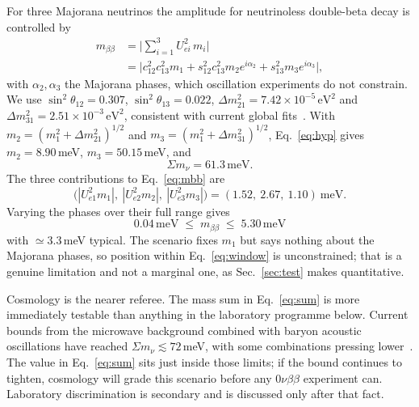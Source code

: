 \documentclass[aps,prd,twocolumn,superscriptaddress,nofootinbib,10pt]{revtex4-2}
\begin{document}
For three Majorana neutrinos the amplitude for neutrinoless double-beta decay is controlled by
%
\begin{equation}
  \begin{aligned}
    m_{\beta\beta} &= \Big| \sum_{i=1}^{3} U_{ei}^2\, m_i \Big| \\[2pt]
    &= \Big| c_{12}^2 c_{13}^2 m_1 + s_{12}^2 c_{13}^2 m_2 e^{i\alpha_2}
       + s_{13}^2 m_3 e^{i\alpha_3} \Big|,
  \end{aligned}
  \label{eq:mbb}
\end{equation}
%
with $\alpha_2, \alpha_3$ the Majorana phases, which oscillation experiments do not constrain. We
use $\sin^2\theta_{12} = 0.307$, $\sin^2\theta_{13} = 0.022$,
$\Delta m^2_{21} = 7.42 \times 10^{-5}\,\mathrm{eV}^2$ and
$\Delta m^2_{31} = 2.51 \times 10^{-3}\,\mathrm{eV}^2$, consistent with current global
fits~\cite{NuFIT2020,PDG2024}. With $m_2 = (m_1^2 + \Delta m^2_{21})^{1/2}$ and
$m_3 = (m_1^2 + \Delta m^2_{31})^{1/2}$, Eq.~\eqref{eq:hyp} gives
$m_2 = 8.90\,$meV, $m_3 = 50.15\,$meV, and
%
\begin{equation}
  \Sigma m_\nu = 61.3\,\mathrm{meV}.
  \label{eq:sum}
\end{equation}
%
The three contributions to Eq.~\eqref{eq:mbb} are
%
\begin{equation}
  \big( |U_{e1}^2 m_1|,\ |U_{e2}^2 m_2|,\ |U_{e3}^2 m_3| \big)
  = (1.52,\ 2.67,\ 1.10)\ \mathrm{meV}.
  \label{eq:terms}
\end{equation}
%
Varying the phases over their full range gives
%
\begin{equation}
  \boxed{\ 0.04\,\mathrm{meV} \;\le\; m_{\beta\beta} \;\le\; 5.30\,\mathrm{meV}\ }
  \label{eq:window}
\end{equation}
%
with $\simeq 3.3\,$meV typical. The scenario fixes $m_1$ but says nothing about the Majorana
phases, so position within Eq.~\eqref{eq:window} is unconstrained; that is a genuine limitation and
not a marginal one, as Sec.~\ref{sec:test} makes quantitative.

Cosmology is the nearer referee. The mass sum in Eq.~\eqref{eq:sum} is more immediately testable
than anything in the laboratory programme below. Current bounds from the microwave background
combined with baryon acoustic oscillations have reached $\Sigma m_\nu \lesssim 72\,$meV, with some
combinations pressing lower~\cite{DESI2024}. The value in Eq.~\eqref{eq:sum} sits just inside those
limits; if the bound continues to tighten, cosmology will grade this scenario before any
$0\nu\beta\beta$ experiment can. Laboratory discrimination is secondary and is discussed only after
that fact.
\end{document}

